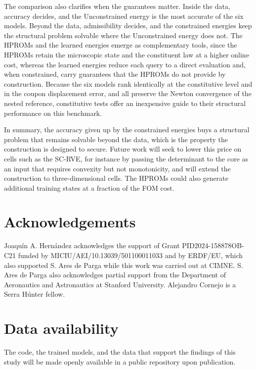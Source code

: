 The comparison also clarifies when the guarantees matter.  Inside the data, accuracy decides, and the Unconstrained energy is the most accurate of the six models.  Beyond the data, admissibility decides, and the constrained energies keep the structural problem solvable where the Unconstrained energy does not.  The HPROMs and the learned energies emerge as complementary tools, since the HPROMs retain the microscopic state and the constituent law at a higher online cost, whereas the learned energies reduce each query to a direct evaluation and, when constrained, carry guarantees that the HPROMs do not provide by construction.  Because the six models rank identically at the constitutive level and in the coupon displacement error, and all preserve the Newton convergence of the nested reference, constitutive tests offer an inexpensive guide to their structural performance on this benchmark.

In summary, the accuracy given up by the constrained energies buys a structural problem that remains solvable beyond the data, which is the property the construction is designed to secure.  Future work will seek to lower this price on cells such as the SC-RVE, for instance by passing the determinant to the core as an input that requires convexity but not monotonicity, and will extend the construction to three-dimensional cells.  The HPROMs could also generate additional training states at a fraction of the FOM cost.

\section*{Acknowledgements}
Joaqu\'in A. Hern\'andez acknowledges the support of Grant PID2024-158878OB-C21 funded by MICIU/AEI/10.13039/501100011033 and by ERDF/EU, which also supported S. Ares de Parga while this work was carried out at CIMNE. S. Ares de Parga also acknowledges partial support from the Department of Aeronautics and Astronautics at Stanford University. Alejandro Cornejo is a Serra H\'unter fellow.

\section*{Data availability}
The code, the trained models, and the data that support the findings of this study will be made openly available in a public repository upon publication.

\FloatBarrier
\appendix
